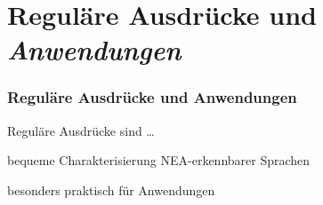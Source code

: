   \section[Reguläre Ausdrücke]{Reguläre Ausdrücke und \protect\emph{Anwendungen}}

    \begin{frame}
      \frametitle{Reguläre Ausdrücke und Anwendungen}
      
      Reguläre Ausdrücke sind \dots
      
      \begin{Itemize}
        \item
          bequeme Charakterisierung NEA-erkennbarer Sprachen
        \item
          besonders praktisch für Anwendungen
      \end{Itemize}
      
    \end{frame}

